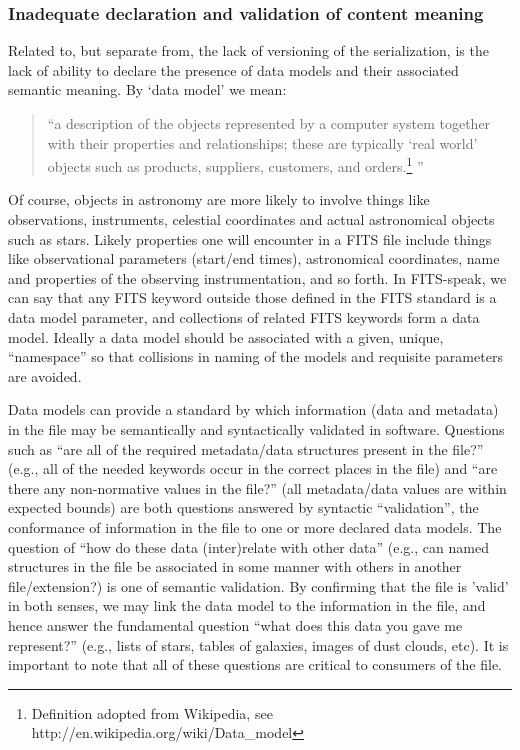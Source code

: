 \documentclass[final,authoryear,5p,times,twocolumn]{elsarticle}
\begin{document}
{{\subsubsection{Inadequate declaration and validation of content meaning}


Related to, but separate from, the lack of versioning of the
serialization, is the lack of ability to declare the presence of data
models and their associated semantic meaning.  By `data model' we
mean:


\begin{quote}
``a description of the objects represented by a computer system
together with their properties and relationships; these are typically
`real world' objects such as products, suppliers, customers, and
orders.\footnote{Definition adopted from Wikipedia, see http://en.wikipedia.org/wiki/Data\_model}
''
\end{quote}


Of course, objects in astronomy are more likely to involve things like
observations, instruments, celestial coordinates and actual astronomical
objects such as stars. Likely properties one will encounter in a FITS
file include things like observational parameters (start/end times),
astronomical coordinates, name and properties of the observing
instrumentation, and so forth. In FITS-speak, we can say that any FITS
keyword outside those defined in the FITS standard is a data model
parameter, and collections of related FITS keywords form a data model.
Ideally a data model should be associated with a given, unique,
``namespace'' so that collisions in naming of the models and requisite
parameters are avoided.


Data models can provide a standard by which information (data and metadata)
in the file may be semantically and syntactically validated in software.
Questions such as ``are all of the required metadata/data structures present
in the file?'' (e.g., all of
the needed keywords occur in the correct places in the file) and ``are
there any non-normative values in the file?'' (all metadata/data values
are within expected bounds) are both questions answered by syntactic
``validation'', the conformance of information in the file to one or more
declared data models.  The question of ``how do these data (inter)relate
with other data'' (e.g., can named structures in the file be associated
in some manner with others in another file/extension?) is one of semantic
validation. By confirming that the file is 'valid' in both senses, we may
link the data model to the information in the file, and hence answer the
fundamental question ``what does this data you gave me represent?'' (e.g., lists
of stars, tables of galaxies, images of dust clouds, etc).
It is important to note that all of these questions are critical to
consumers of the file.


}}
\end{document}
